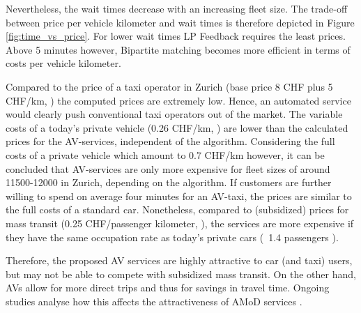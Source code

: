 Nevertheless, the wait times decrease with an increasing fleet size. The trade-off between price per vehicle kilometer and wait times is therefore depicted in Figure \ref{fig:time_vs_price}. For lower wait times LP Feedback requires the least prices. Above 5 minutes however, Bipartite matching becomes more efficient in terms of costs per vehicle kilometer. 


Compared to the price of a taxi operator in Zurich (base price 8 CHF plus 5 CHF/km, \cite{StadtZurich2014})
the computed prices are extremely low. Hence, an automated service would clearly
push conventional taxi operators out of the market. The variable costs of a today's 
private vehicle (0.26 CHF/km, \cite{TCS2016}) are lower than the calculated prices for the AV-services, 
independent of the algorithm. Considering the full costs of a private vehicle which amount to 0.7 CHF/km \cite{TCS2016} however, it can be concluded that AV-services are only more expensive for fleet sizes of around 11500-12000 
in Zurich, depending on the algorithm. If customers are further willing to spend on average four minutes 
for an AV-taxi, the prices are similar to the full costs of a standard car.
Nonetheless, compared to (subsidized) prices for mass transit (0.25 CHF/passenger kilometer, \cite{Bosch2016a}), the services are more expensive if they have the same occupation rate as today's private cars (~1.4 passengers \cite{Bosch2016a}).

Therefore, the proposed AV services are highly attractive to car (and taxi) users, but may
not be able to compete with subsidized mass transit. On the other hand, AVs
allow for more direct trips and thus for savings in travel time. Ongoing studies analyse how this affects the attractiveness of AMoD services \cite{Becker2017}.



